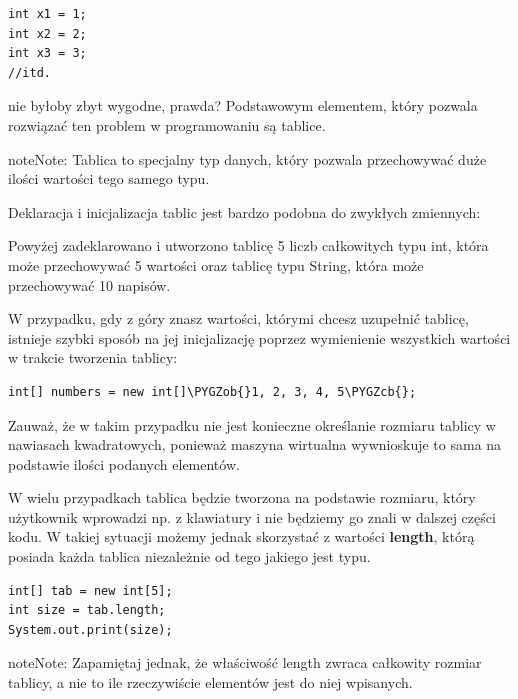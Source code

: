\documentclass[letterpaper,10pt,english]{sphinxmanual}
\def\PYGZob{\char`\{}
\def\PYGZcb{\char`\}}
\begin{document}
\begin{Verbatim}[commandchars=\\\{\}]
int x1 = 1;
int x2 = 2;
int x3 = 3;
//itd.
\end{Verbatim}

nie byłoby zbyt wygodne, prawda?
Podstawowym elementem, który pozwala rozwiązać ten problem w programowaniu są tablice.

\begin{notice}{note}{Note:}
Tablica to specjalny typ danych, który pozwala przechowywać duże ilości wartości tego samego typu.
\end{notice}

Deklaracja i inicjalizacja tablic jest bardzo podobna do zwykłych zmiennych:

Powyżej zadeklarowano i utworzono tablicę 5 liczb całkowitych typu int, która może przechowywać 5 wartości oraz tablicę typu String, która może przechowywać 10 napisów.

W przypadku, gdy z góry znasz wartości, którymi chcesz uzupełnić tablicę, istnieje szybki sposób na jej inicjalizację poprzez wymienienie wszystkich wartości w trakcie tworzenia tablicy:

\begin{Verbatim}[commandchars=\\\{\}]
int[] numbers = new int[]\PYGZob{}1, 2, 3, 4, 5\PYGZcb{};
\end{Verbatim}

Zauważ, że w takim przypadku nie jest konieczne określanie rozmiaru tablicy w nawiasach kwadratowych, ponieważ maszyna wirtualna wywnioskuje to sama na podstawie ilości podanych elementów.

W wielu przypadkach tablica będzie tworzona na podstawie rozmiaru, który użytkownik wprowadzi np. z klawiatury i nie będziemy go znali w dalszej części kodu. W takiej sytuacji możemy jednak skorzystać z wartości \textbf{length}, którą posiada każda tablica niezależnie od tego jakiego jest typu.

\begin{Verbatim}[commandchars=\\\{\}]
int[] tab = new int[5];
int size = tab.length;
System.out.print(size);
\end{Verbatim}

\begin{notice}{note}{Note:}
Zapamiętaj jednak, że właściwość length zwraca całkowity rozmiar tablicy, a nie to ile rzeczywiście elementów jest do niej wpisanych.
\end{notice}
\end{document}
